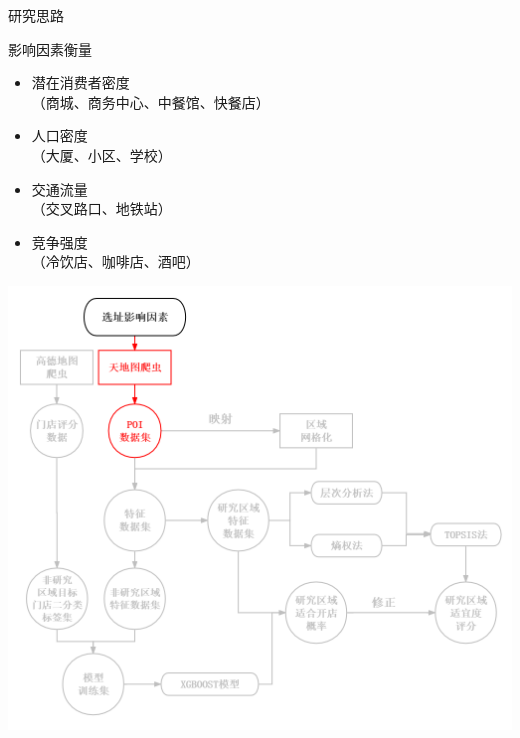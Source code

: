 \documentclass{beamer}
\begin{document}
\begin{frame}{研究思路}   
    \begin{minipage}{0.37\textwidth}
        影响因素衡量
        \begin{itemize}
            \item 潜在消费者密度 \\
                {\footnotesize（商城、商务中心、中餐馆、快餐店）}
            \item 人口密度 \\
                {\footnotesize（大厦、小区、学校）}
            \item 交通流量 \\
                {\footnotesize（交叉路口、地铁站）}
            \item 竞争强度 \\
            {\footnotesize（冷饮店、咖啡店、酒吧）}
        \end{itemize}
        
        
      \end{minipage}
      \hfill
      \begin{minipage}{0.6\textwidth}
        \includegraphics[width=1\textwidth]{pic/2.png}
      \end{minipage}
\end{frame}
\end{document}
